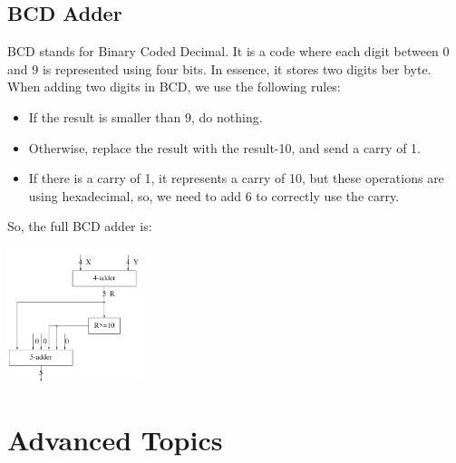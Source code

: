 \documentclass[nobib]{tufte-handout}
\begin{document}
\subsection{BCD Adder}
BCD stands for Binary Coded Decimal. It is a code where each digit between 0
and 9 is represented using four bits. In essence, it stores two digits ber
byte.\\ When adding two digits in BCD, we use the following rules:
\begin{itemize}
    \item If the result is smaller than 9, do nothing.
    \item Otherwise, replace the result with the result-10, and send a carry of 1.
    \item If there is a carry of 1, it represents a carry of 10, but these operations are
          using hexadecimal, so, we need to add 6 to correctly use the carry.
\end{itemize}
So, the full BCD adder is:\\
\begin{center}
    \includegraphics[width = 150px]{images/bcd_adder.png}
\end{center}
\section{Advanced Topics}
\end{document}
